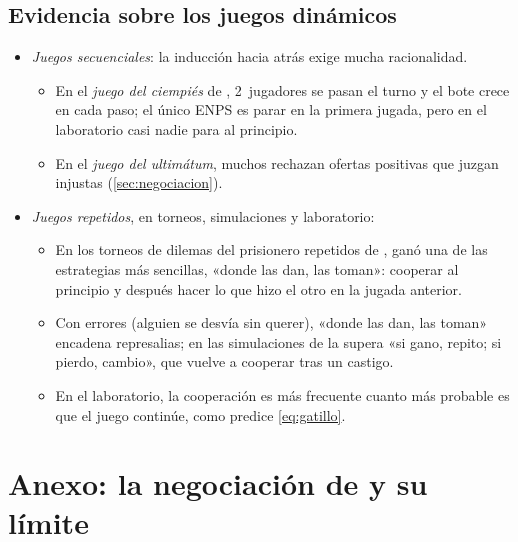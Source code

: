 \documentclass[11pt]{article}
\begin{document}
\subsection*{Evidencia sobre los juegos dinámicos}\label{anexo:evidencia-dinamicos}

\begin{itemize}
\item \emph{Juegos secuenciales}: la inducción hacia atrás exige mucha racionalidad.
  \begin{itemize}
  \item En el \emph{juego del ciempiés} de \textcite{Rosenthal1981Games}, 2~jugadores se pasan el turno y el bote crece en cada paso; el único ENPS es parar en la primera jugada, pero en el laboratorio casi nadie para al principio\nocite{McKelveyPalfrey1992Experimental}.
  \item En el \emph{juego del ultimátum}, muchos rechazan ofertas positivas que juzgan injustas (\ref{sec:negociacion}).
  \end{itemize}
\item \emph{Juegos repetidos}, en torneos, simulaciones y laboratorio:
  \begin{itemize}
  \item En los torneos de dilemas del prisionero repetidos de \textcite{Axelrod1984Evolution}, ganó una de las estrategias más sencillas, «donde las dan, las toman»: cooperar al principio y después hacer lo que hizo el otro en la jugada anterior.
  \item Con errores (alguien se desvía sin querer), «donde las dan, las toman» encadena represalias; en las simulaciones de \textcite{NowakSigmund1993Strategy} la supera «si gano, repito; si pierdo, cambio», que vuelve a cooperar tras un castigo.
  \item En el laboratorio, la cooperación es más frecuente cuanto más probable es que el juego continúe, como predice \eqref{eq:gatillo}\nocite{DalBo2005Cooperation}.
  \end{itemize}
\end{itemize}

\section{Anexo: la negociación de  y su límite}\label{anexo:rubinstein}
\end{document}
